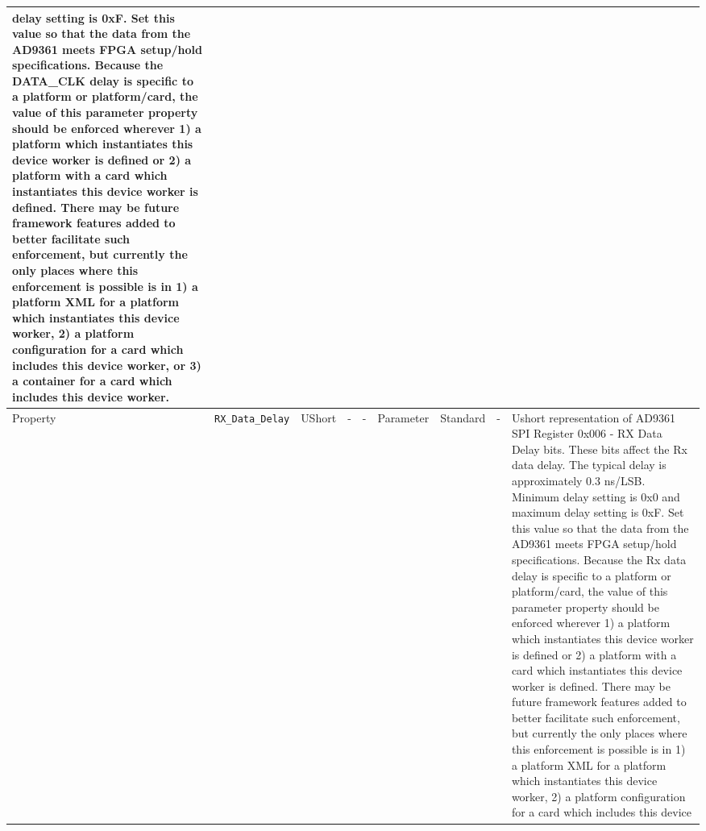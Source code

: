 \documentclass{article}
\begin{document}
\begin{landscape}
\begin{scriptsize}
\begin{longtable}{|p{2cm}|p{2.5cm}|p{1cm}|p{2cm}|p{2cm}|p{1.75cm}|p{2cm}|p{2.25cm}|p{5.04cm}|}
                         delay setting is 0xF. Set this value so that the
                         data from the AD9361 meets FPGA setup/hold
                         specifications.
                         Because the DATA\_CLK delay is specific to a platform or
                         platform/card, the value of this parameter property
                         should be enforced wherever 1) a platform which
                         instantiates this device worker is defined or 2) a
                         platform with a card which instantiates this device
                         worker is defined. There may be future framework
                         features added to better facilitate such enforcement,
                         but currently the only places where this enforcement is
                         possible is in 1) a platform XML for a platform which
                         instantiates this device worker, 2) a platform
                         configuration for a card which includes this device
                         worker, or 3) a container for a card which includes
                         this device worker.
\\
			\hline
			Property     & \verb+RX_Data_Delay+ & UShort&-              & -               & Parameter     & Standard           & -       &
Ushort representation of AD9361 SPI Register 0x006 -
                         RX Data Delay bits. These bits affect the
                         Rx data delay. The typical delay is approximately
                         0.3 ns/LSB. Minimum delay setting is 0x0 and maximum
                         delay setting is 0xF. Set this value so that the
                         data from the AD9361 meets FPGA setup/hold
                         specifications.
                         Because the Rx data delay is specific to a platform or
                         platform/card, the value of this parameter property
                         should be enforced wherever 1) a platform which
                         instantiates this device worker is defined or 2) a
                         platform with a card which instantiates this device
                         worker is defined. There may be future framework
                         features added to better facilitate such enforcement,
                         but currently the only places where this enforcement is
                         possible is in 1) a platform XML for a platform which
                         instantiates this device worker, 2) a platform
                         configuration for a card which includes this device

\end{longtable}
\end{scriptsize}
\end{landscape}
\end{document}
